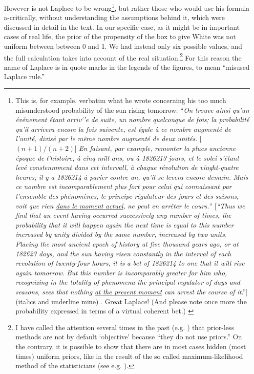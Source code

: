 \documentclass[11pt]{article}
\begin{document}
However is not Laplace
to be wrong\footnote{This is, for example, verbatim what he wrote
concerning his too much misunderstood probability
of the sun rising tomorrow: ``{\sl On trouve ainsi qu'un 
\'ev\'enement \'etant arriv`'e de suite, un nombre quelconque de fois;
la probabilit\'e qu'il arrivera encore la fois 
suivente, est \'egale \`a ce nombre augment\'e de l'unit\'e, 
divis\'e par le m\^eme nombre augment\'e
de deux unit\'es.} [$(n+1)/(n+2)$] {\sl En faisant, 
par example, remonter la plues ancienne \'epoque de l'histoire,
\`a cinq mill ans, ou \`a 1826213 jours, et 
le solei s'\'etant lev\'e constenmment dans
cet intervall, \`a chaque r\'evolution de vinght-quatre heures; il y a
1826214 \`a parier contre un, qu'il se levera encore demain.
{\it Mais ce nombre est incomparablement plus fort pour celui
qui connaissant par l'ensemble des ph\'enom\`enes, 
le principe r\'egulateur des jours et des saisons, 
voit que rien \underline{dans le moment actuel}, 
ne peut en arr\^eter le cours.}}'' [{\sl ``Thus we find that 
an event having occurred successively
any number of times, the probability that it will
happen again the next time is equal
to this number increased by unity divided
by the same number, increased by two units. Placing the most ancient epoch
of history at five thousand years ago, or 
at 182623 days, and the sun having risen constantly in the interval
of each revolution of twenty-four hours, it is a bet of 1826214 
to one that it will rise again tomorrow.} {\it But this number
 is incomparably greater for him who, recognizing in the totality
 of phenomena the principal regulator of days and seasons, 
sees that nothing \underline{at the present moment}
 can arrest the course of it}.''] 
(italics and underline mine) \cite{Laplace}. Great Laplace! 
(And please note once more the probability
expressed in terms of a virtual coherent bet.)
\label{fn:Laplace_Sole} 
}, 
but rather those who would use his formula
a-critically, without understanding the assumptions
behind it, which were discussed in detail in the text. 
In our specific case, as it might be in important cases 
of real life, the prior of the propensity of the box to give
White was not uniform between 
between 0 and 1. We had instead only six possible values,
and the full calculation takes into account of the real 
situation.\footnote{I have called the attention several times
in the past (e.g. \cite{BR}) that prior-less methods
are not by default `objective' because ``they do not use
priors.'' On the contrary, it is possible to show that 
there are in most cases hidden (most times) uniform 
priors, like in the result of the so called maximum-likelihood 
method of the statisticians (see e.g. \cite{BR}).
} For this reason the name of Laplace is in quote marks
in the legends of the figures, to mean ``misused Laplace rule.''
\end{document}
